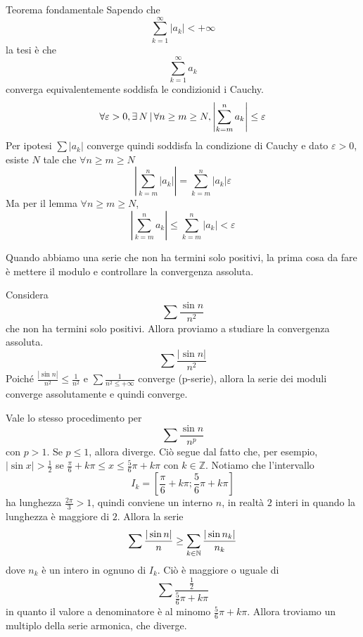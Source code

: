 \documentclass[a4paper]{article}
\begin{document}
\begin{snippetproof}{Teorema fondamentale}
    Sapendo che
    \[
        \sum_{k=1}^\infty |a_k| < +\infty
    \]
    la tesi è che
    \[
        \sum_{k=1}^\infty a_k
    \]
    converga equivalentemente soddisfa le condizionid i Cauchy.
    \[
        \forall \varepsilon > 0, \exists\, N \,|\,
        \forall n \geq m \geq N, \left|\sum_{k=m}^n a_k\right| \leq \varepsilon
    \]
    Per ipotesi \(\sum |a_k|\) converge quindi soddisfa la condizione di Cauchy
    e dato \(\varepsilon > 0\), esiste \(N\) tale che \(\forall n \geq m \geq N\)
    \[
    \left|
        \sum_{k=m}^n |a_k|
    \right|
    = \sum_{k=m}^n |a_k| \varepsilon
    \]
    Ma per il lemma \(\forall n \geq m \geq N\),
    \[
        \left|
        \sum_{k=m}^n a_k
        \right|
        \leq \sum_{k=m}^n |a_k| < \varepsilon
    \]
\end{snippetproof}

Quando abbiamo una serie che non ha termini solo positivi, la prima cosa da fare
è mettere il modulo e controllare la convergenza assoluta.

\begin{snippetexample}{}
    Considera
    \[
        \sum \frac{\sin n}{n^2}
    \]
    che non ha termini solo positivi. Allora proviamo a studiare la convergenza assoluta.
    \[
        \sum \frac{|\sin n|}{n^2}
    \]
    Poiché \(\frac{|\sin n|}{n^2} \leq \frac{1}{n^2}\)
    e \(\sum \frac{1}{n^2 \leq +\infty}\)
    converge (p-serie), allora la serie dei moduli converge assolutamente e quindi converge.
\end{snippetexample}

Vale lo stesso procedimento per
\[
    \sum \frac{\sin n}{n^p}
\]
con \(p > 1\).
Se \(p \leq 1\), allora diverge. Ciò segue dal fatto che, per esempio,
\(|\sin x| > \frac{1}{2}\) se \(\frac{\pi}{6} + k\pi \leq x \leq \frac{5}{6}\pi + k\pi\)
con \(k\in\mathbb{Z}\). Notiamo che l'intervallo
\[
    I_k = \left[\frac{\pi}{6} + k\pi; \frac{5}{6}\pi + k\pi\right]
\]
ha lunghezza \(\frac{2\pi}{3} > 1\), quindi conviene un interno \(n\),
in realtà \(2\) interi in quando la lunghezza è maggiore di \(2\).
Allora la serie \[
    \sum \frac{|\sin n|}{n}
    \geq 
    \sum_{k\in\mathbb{N}} \frac{|\sin n_k|}{n_k}
\]
dove \(n_k\) è un intero in ognuno di \(I_k\).
Ciò è maggiore o uguale di
\[
    \sum \frac{\frac{1}{2}}{\frac{5}{6} \pi + k\pi}
\]
in quanto il valore a denominatore è al minomo \(\frac{5}{6} \pi + k\pi\).
Allora troviamo un multiplo della serie armonica, che diverge.
\end{document}
